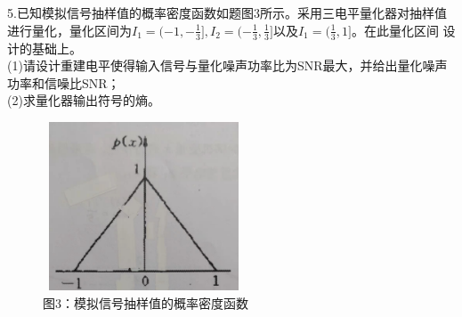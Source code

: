 \documentclass[UTF8]{ctexart}
\begin{document}
\section*{}
5.已知模拟信号抽样值的概率密度函数如题图3所示。采用三电平量化器对抽样值进行量化，量化区间为$I_1
  =(-1,-\frac{1}{3}],I_2=(-\frac{1}{3},\frac{1}{3}]$以及$I_1=(\frac{1}{3},1]$。在此量化区间
设计的基础上。\\
(1)请设计重建电平使得输入信号与量化噪声功率比为SNR最大，并给出量化噪声功率和信噪比SNR；\\
(2)求量化器输出符号的熵。\\
\begin{figure}[H]
  \centering
  \includegraphics[width=6cm,height=5cm]{3.jpg}
  \caption*{图3：模拟信号抽样值的概率密度函数}
\end{figure}
\end{document}
